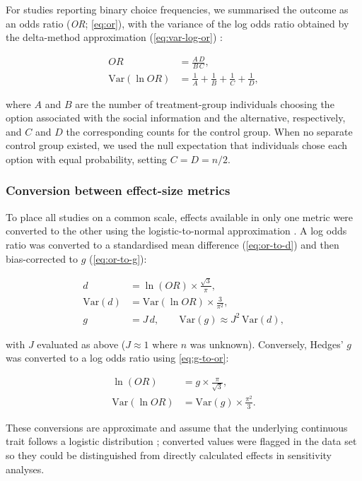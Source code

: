 For studies reporting binary choice frequencies, we summarised the outcome
as an odds ratio (\textit{OR}; \autoref{eq:or}), with the variance of the log
odds ratio obtained by the delta-method approximation
(\autoref{eq:var-log-or}) \citep{borensteinIntroductionMetaanalysis2011}:

\begin{align}
  \mathit{OR}              &= \frac{A \, D}{B \, C}, \label{eq:or} \\[4pt]
  \mathrm{Var}(\ln \mathit{OR}) &= \frac{1}{A} + \frac{1}{B} + \frac{1}{C} + \frac{1}{D}, \label{eq:var-log-or}
\end{align}

\noindent where $A$ and $B$ are the number of treatment-group individuals
choosing the option associated with the social information and the
alternative, respectively, and $C$ and $D$ the corresponding counts for the
control group. When no separate control group existed, we used the null
expectation that individuals chose each option with equal probability,
setting $C = D = n/2$.

\subsubsection{Conversion between effect-size metrics}

To place all studies on a common scale, effects available in only one metric
were converted to the other using the logistic-to-normal approximation
\citep{chinnSimpleMethodConverting2000, borensteinIntroductionMetaanalysis2011}.
A log odds ratio was converted to a standardised mean difference
(\autoref{eq:or-to-d}) and then bias-corrected to $g$
(\autoref{eq:or-to-g}):

\begin{align}
  d               &= \ln(\mathit{OR}) \times \frac{\sqrt{3}}{\pi}, \label{eq:or-to-d} \\[4pt]
  \mathrm{Var}(d) &= \mathrm{Var}(\ln \mathit{OR}) \times \frac{3}{\pi^{2}}, \label{eq:or-to-var-d} \\[4pt]
  g               &= J \, d, \qquad \mathrm{Var}(g) \approx J^{2}\,\mathrm{Var}(d), \label{eq:or-to-g}
\end{align}

\noindent with $J$ evaluated as above ($J \approx 1$ where $n$ was unknown).
Conversely, Hedges' $g$ was converted to a log odds ratio using
\autoref{eq:g-to-or}:

\begin{align}
  \ln(\mathit{OR})              &= g \times \frac{\pi}{\sqrt{3}}, \label{eq:g-to-or} \\[4pt]
  \mathrm{Var}(\ln \mathit{OR}) &= \mathrm{Var}(g) \times \frac{\pi^{2}}{3}. \label{eq:g-to-var-or}
\end{align}

\noindent These conversions are approximate and assume that the underlying
continuous trait follows a logistic distribution
\citep{chinnSimpleMethodConverting2000}; converted values were flagged in the
data set so they could be distinguished from directly calculated effects in
sensitivity analyses.
